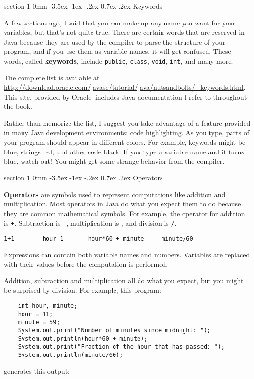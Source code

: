 \documentclass{book}
\makeatletter
\renewcommand{\section}{\@startsection 
    {section} {1} {0mm}%
    {-3.5ex \@plus -1ex \@minus -.2ex}%
    {0.7ex \@plus.2ex}%
    {\normalfont\Large\bfseries}}
\makeatother
\begin{document}
\section{Keywords}

A few sections ago, I said that you can make up any name you
want for your variables, but that's not quite true.  There
are certain words that are reserved in Java because they are
used by the compiler to parse the structure of your program,
and if you use them as variable names, it will get confused.
These words, called {\bf keywords}, include {\tt public},
{\tt class}, {\tt void}, {\tt int}, and many more.

The complete list is available at \url{http://download.oracle.com/javase/tutorial/java/nutsandbolts/_keywords.html}.
This site, provided by Oracle, includes Java documentation I refer to
throughout the book.

Rather than memorize the list, I suggest you
take advantage of a feature provided in many Java development
environments: code highlighting.  As you type,
parts of your program should appear in different colors.  For
example, keywords might be blue, strings red, and other code
black.  If you type a variable name and it turns blue, watch
out!  You might get some strange behavior from the compiler.


\section{Operators}

{\bf Operators} are symbols used to represent
computations like addition and multiplication.  Most
operators in Java do what you expect them
to do because they are common mathematical symbols.  For
example, the operator for addition is {\tt +}.  Subtraction
is {\tt -}, multiplication is {\tt *}, and division is {\tt /}.

\begin{verbatim}
1+1        hour-1       hour*60 + minute     minute/60
\end{verbatim}
%
Expressions can contain both variable
names and numbers.  Variables are
replaced with their values before the computation is performed.


Addition, subtraction and multiplication all do what you
expect, but you might be surprised by division.  For example,
this program:

\begin{verbatim}
    int hour, minute;
    hour = 11;
    minute = 59;
    System.out.print("Number of minutes since midnight: ");
    System.out.println(hour*60 + minute);
    System.out.print("Fraction of the hour that has passed: ");
    System.out.println(minute/60);
\end{verbatim}
%
generates this output:
\end{document}
